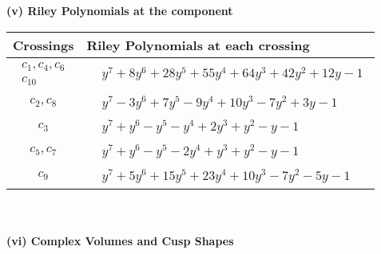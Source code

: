 \documentclass[1p]{elsarticle_modified}
\theoremstyle{definition}
\begin{document}
\newpage\renewcommand{\arraystretch}{1}
\flushleft \textbf{(v) Riley Polynomials at the component}\newline \\
\begin{tabular}{m{50pt}|m{274pt}}
Crossings & \hspace{64pt}Riley Polynomials at each crossing \\
\hline $$\begin{aligned}c_{1},c_{4},c_{6}\\c_{10}\end{aligned}$$&$\begin{aligned}
&y^7+8 y^6+28 y^5+55 y^4+64 y^3+42 y^2+12 y-1
\end{aligned}$\\
\hline $$\begin{aligned}c_{2},c_{8}\end{aligned}$$&$\begin{aligned}
&y^7-3 y^6+7 y^5-9 y^4+10 y^3-7 y^2+3 y-1
\end{aligned}$\\
\hline $$\begin{aligned}c_{3}\end{aligned}$$&$\begin{aligned}
&y^7+y^6- y^5- y^4+2 y^3+y^2- y-1
\end{aligned}$\\
\hline $$\begin{aligned}c_{5},c_{7}\end{aligned}$$&$\begin{aligned}
&y^7+y^6- y^5-2 y^4+y^3+y^2- y-1
\end{aligned}$\\
\hline $$\begin{aligned}c_{9}\end{aligned}$$&$\begin{aligned}
&y^7+5 y^6+15 y^5+23 y^4+10 y^3-7 y^2-5 y-1
\end{aligned}$\\
\hline
\end{tabular}\\~\\
\newpage\flushleft \textbf{(vi) Complex Volumes and Cusp Shapes}
\end{document}
